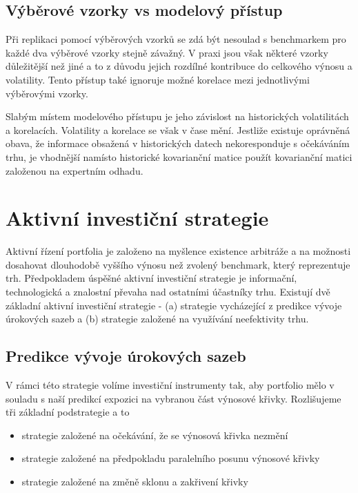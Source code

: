 \documentclass[a4paper]{book}
\begin{document}
\section{Výběrové vzorky vs modelový přístup}

Při replikaci pomocí výběrových vzorků se zdá být nesoulad s benchmarkem pro každé dva výběrové vzorky stejně závažný. V praxi jsou však některé vzorky důležitější než jiné a to z důvodu jejich rozdílné kontribuce do celkového výnosu a volatility. Tento přístup také ignoruje možné korelace mezi jednotlivými výběrovými vzorky.

Slabým místem modelového přístupu je jeho závislost na historických volatilitách a korelacích. Volatility a korelace se však v čase mění. Jestliže existuje oprávněná obava, že informace obsažená v historických datech nekoresponduje s očekáváním trhu, je vhodnější namísto historické kovarianční matice použít kovarianční matici založenou na expertním odhadu.

\chapter{Aktivní investiční strategie}

Aktivní řízení portfolia je založeno na myšlence existence arbitráže a na možnosti dosahovat dlouhodobě vyššího výnosu než zvolený benchmark, který reprezentuje trh. Předpokladem úspěšné aktivní investiční strategie je informační, technologická a znalostní převaha nad ostatními účastníky trhu. Existují dvě základní aktivní investiční strategie - (a) strategie vycházející z predikce vývoje úrokových sazeb a (b) strategie založené na využívání neefektivity trhu.

\section{Predikce vývoje úrokových sazeb}

V rámci této strategie volíme investiční instrumenty tak, aby portfolio mělo v souladu s naší predikcí expozici na vybranou část výnosové křivky. Rozlišujeme tři základní podstrategie a to
\begin{itemize}
\item strategie založené na očekávání, že se výnosová křivka nezmění
\item strategie založené na předpokladu paralelního posunu výnosové křivky
\item strategie založené na změně sklonu a zakřivení křivky
\end{itemize}
\end{document}
